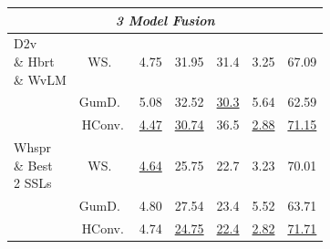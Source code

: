\begin{table}[h!]
\begin{tabular}{lcccccc}
\hline
\hline
\multicolumn{7}{c}{\textit{3 Model Fusion}} \\
\hline


\multirowcell{ 3}{D2v  \\ \& Hbrt \\ \& WvLM } 
& WS.~\cite{chiu24_sinica}			& 4.75 & 31.95 & 31.4 & 3.25 & 67.09 \\
& GumD.~\cite{chiu24_sinica}	        & 5.08 & 32.52 & \underline{30.3} & 5.64 & 62.59 \\
& HConv.		& \underline{4.47} & \underline{30.74} & 36.5 & \underline{2.88} & \underline{71.15} \\
\hline
\multirowcell{ 3}{Whspr  \\ \& Best \\ 2 SSLs } 
& WS.~\cite{chiu24_sinica}			& \underline{4.64} & 25.75 & 22.7 & 3.23 & 70.01\\
& GumD.~\cite{chiu24_sinica}     	& 4.80 & 27.54 & 23.4 & 5.52 & 63.71\\
& HConv.		& 4.74 & \underline{24.75} & \underline{22.4} & \underline{2.82} & \underline{71.71}\\





    
    \hline
  \end{tabular}
\end{table}
